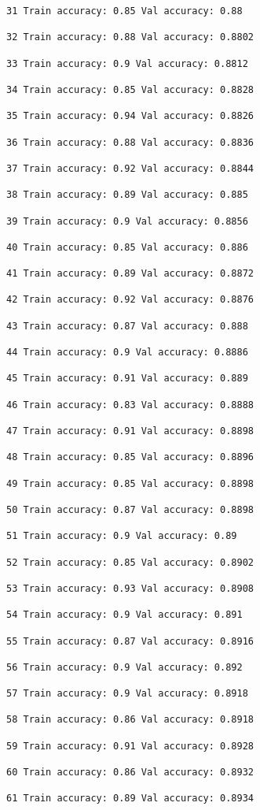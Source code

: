 \documentclass[11pt]{article}
\begin{document}
\begin{Verbatim}[commandchars=\\\{\}]
31 Train accuracy: 0.85 Val accuracy: 0.88

32 Train accuracy: 0.88 Val accuracy: 0.8802

33 Train accuracy: 0.9 Val accuracy: 0.8812

34 Train accuracy: 0.85 Val accuracy: 0.8828

35 Train accuracy: 0.94 Val accuracy: 0.8826

36 Train accuracy: 0.88 Val accuracy: 0.8836

37 Train accuracy: 0.92 Val accuracy: 0.8844

38 Train accuracy: 0.89 Val accuracy: 0.885

39 Train accuracy: 0.9 Val accuracy: 0.8856

40 Train accuracy: 0.85 Val accuracy: 0.886

41 Train accuracy: 0.89 Val accuracy: 0.8872

42 Train accuracy: 0.92 Val accuracy: 0.8876

43 Train accuracy: 0.87 Val accuracy: 0.888

44 Train accuracy: 0.9 Val accuracy: 0.8886

45 Train accuracy: 0.91 Val accuracy: 0.889

46 Train accuracy: 0.83 Val accuracy: 0.8888

47 Train accuracy: 0.91 Val accuracy: 0.8898

48 Train accuracy: 0.85 Val accuracy: 0.8896

49 Train accuracy: 0.85 Val accuracy: 0.8898

50 Train accuracy: 0.87 Val accuracy: 0.8898

51 Train accuracy: 0.9 Val accuracy: 0.89

52 Train accuracy: 0.85 Val accuracy: 0.8902

53 Train accuracy: 0.93 Val accuracy: 0.8908

54 Train accuracy: 0.9 Val accuracy: 0.891

55 Train accuracy: 0.87 Val accuracy: 0.8916

56 Train accuracy: 0.9 Val accuracy: 0.892

57 Train accuracy: 0.9 Val accuracy: 0.8918

58 Train accuracy: 0.86 Val accuracy: 0.8918

59 Train accuracy: 0.91 Val accuracy: 0.8928

60 Train accuracy: 0.86 Val accuracy: 0.8932

61 Train accuracy: 0.89 Val accuracy: 0.8934


\end{Verbatim}
\end{document}
